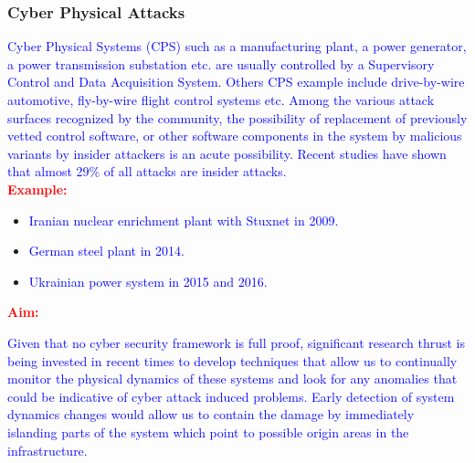 \begin{frame}

\frametitle{Cyber Physical Attacks}

\tiny {\textcolor{blue}{Cyber Physical Systems (CPS) such as a manufacturing plant, a power generator, a power transmission substation etc.
are usually controlled by a Supervisory Control and Data Acquisition System. Others CPS example include drive-by-wire automotive,
fly-by-wire flight control systems etc. Among the various attack surfaces recognized by the community, the possibility of
replacement of previously vetted control software, or other software components in the system by malicious variants by insider
attackers is an acute possibility. Recent studies have shown that almost 29\% of all attacks are insider attacks.} }\\



\textbf{\textcolor{red}{Example:}}


\begin{itemize}


\item \tiny{\textcolor{blue}{ Iranian nuclear enrichment plant with Stuxnet in 2009.}} 

\item \tiny{\textcolor{blue}{German steel plant in 2014.}}

\item \tiny{\textcolor{blue}{Ukrainian power system in 2015 and 2016.}}

\end{itemize}




\textbf{\textcolor{red}{Aim:}}

\tiny {\textcolor{blue}{Given that no cyber security framework is full proof, significant
research thrust is being invested in recent times to develop techniques that allow us 
to continually monitor the physical dynamics of these systems and look for any anomalies
that could be indicative of cyber attack induced problems. Early detection of system 
dynamics changes would allow us to contain the damage by immediately islanding parts 
of the system which point to possible origin areas in the infrastructure. } }

\end{frame}
